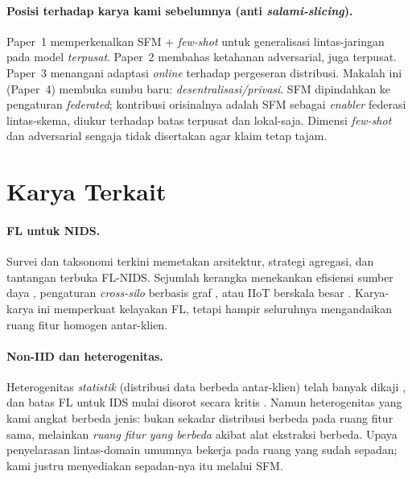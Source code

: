 \documentclass[11pt,a4paper]{article}
\begin{document}
\paragraph{Posisi terhadap karya kami sebelumnya (anti \emph{salami-slicing}).}
Paper~1 \cite{sfm} memperkenalkan SFM + \emph{few-shot} untuk generalisasi
lintas-jaringan pada model \emph{terpusat}. Paper~2 membahas ketahanan
adversarial, juga terpusat. Paper~3 menangani adaptasi \emph{online} terhadap
pergeseran distribusi. Makalah ini (Paper~4) membuka sumbu baru:
\emph{desentralisasi/privasi}. SFM dipindahkan ke pengaturan \emph{federated};
kontribusi orisinalnya adalah SFM sebagai \emph{enabler} federasi lintas-skema,
diukur terhadap batas terpusat dan lokal-saja. Dimensi \emph{few-shot} dan
adversarial sengaja tidak disertakan agar klaim tetap tajam.

\FloatBarrier
\section{Karya Terkait}
\label{sec:related}

\paragraph{FL untuk NIDS.} Survei dan taksonomi terkini
\cite{fsurvey1,fsurvey2,ftaxonomy,falgo} memetakan arsitektur, strategi agregasi,
dan tantangan terbuka FL-NIDS. Sejumlah kerangka menekankan efisiensi sumber daya
\cite{fresource,fdbscan}, pengaturan \emph{cross-silo} berbasis graf \cite{fentente},
atau IIoT berskala besar \cite{fiiot}. Karya-karya ini memperkuat kelayakan FL,
tetapi hampir seluruhnya mengandaikan ruang fitur homogen antar-klien.

\paragraph{Non-IID dan heterogenitas.} Heterogenitas \emph{statistik} (distribusi
data berbeda antar-klien) telah banyak dikaji \cite{fnoniid,fpersonal,fmist}, dan
batas FL untuk IDS mulai disorot secara kritis \cite{flimit}. Namun heterogenitas
yang kami angkat berbeda jenis: bukan sekadar distribusi berbeda pada ruang fitur
sama, melainkan \emph{ruang fitur yang berbeda} akibat alat ekstraksi berbeda.
Upaya penyelarasan lintas-domain \cite{fcrossvan} umumnya bekerja pada ruang yang
sudah sepadan; kami justru menyediakan sepadan-nya itu melalui SFM.
\end{document}
